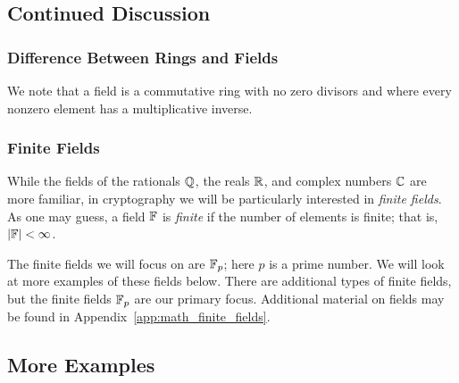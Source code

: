 \subsection{Continued Discussion}

\subsubsection{Difference Between Rings and Fields}

We note that a \gls{field} is a \gls{commutative ring} with no zero divisors
and where every nonzero element has a multiplicative inverse.

\subsubsection{Finite Fields}

While the \glspl{field} of the rationals $\mathbb{Q}$, the reals $\mathbb{R}$,
and complex numbers $\mathbb{C}$ are more familiar,
in cryptography we will be particularly interested
in \emph{\glspl{finite field}}.
As one may guess, a \gls{field} $\mathbb{F}$ is \emph{finite} if the number of
elements is finite; that is, $\left| \mathbb{F} \right|<\infty$.

The \glspl{finite field} we will focus on are $\mathbb{F}_{p}$;
here $p$ is a prime number.
We will look at more examples of these \glspl{field} below.
There are additional types of \glspl{finite field},
but the \glspl{finite field} $\mathbb{F}_{p}$ are our primary focus.
Additional material on \glspl{field} may be found in
Appendix~\ref{app:math_finite_fields}.

\subsection{More Examples}

